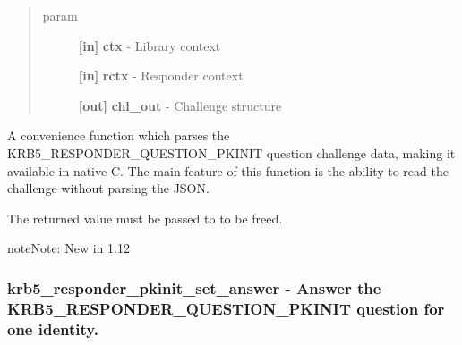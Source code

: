 \documentclass[letterpaper,10pt,english]{sphinxmanual}
\begin{document}
\begin{fulllineitems}
\label{appdev/refs/api/krb5_responder_pkinit_get_challenge:c.krb5_responder_pkinit_get_challenge}
\end{fulllineitems}

\begin{quote}\begin{description}
\item[{param}] \leavevmode
\textbf{{[}in{]}} \textbf{ctx} - Library context

\textbf{{[}in{]}} \textbf{rctx} - Responder context

\textbf{{[}out{]}} \textbf{chl\_out} - Challenge structure

\end{description}\end{quote}

A convenience function which parses the KRB5\_RESPONDER\_QUESTION\_PKINIT question challenge data, making it available in native C. The main feature of this function is the ability to read the challenge without parsing the JSON.

The returned value must be passed to {\hyperref[appdev/refs/api/krb5_responder_pkinit_challenge_free:c.krb5_responder_pkinit_challenge_free]{}} to be freed.

\begin{notice}{note}{Note:}
New in 1.12
\end{notice}


\subsubsection{krb5\_responder\_pkinit\_set\_answer -  Answer the KRB5\_RESPONDER\_QUESTION\_PKINIT question for one identity.}
\label{appdev/refs/api/krb5_responder_pkinit_set_answer:krb5-responder-pkinit-set-answer-answer-the-krb5-responder-question-pkinit-question-for-one-identity}\label{appdev/refs/api/krb5_responder_pkinit_set_answer::doc}
\end{document}
